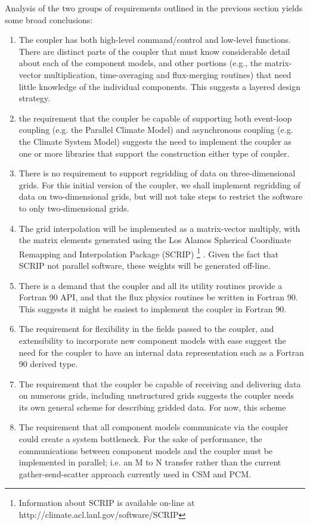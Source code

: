 \documentclass{article}
\begin{document}
Analysis of the two groups of requirements outlined in the
previous section yields some broad conclusions:
\begin{enumerate}
\item The coupler has both high-level command/control and
low-level functions.  There are distinct parts of the coupler
that must know considerable detail about each of the component
models, and other portions (e.g., the matrix-vector
multiplication, time-averaging and flux-merging routines) that
need little knowledge of the individual components.  This
suggests a layered design strategy.
\item the requirement that the coupler be capable of supporting
both event-loop coupling (e.g. the Parallel Climate Model) and
asynchronous coupling (e.g. the Climate System Model) suggests the
need to implement the coupler as one or more libraries that
support the construction either type of coupler.
\item There is no requirement to support regridding of data on
three-dimensional grids.  For this initial version of the
coupler, we shall implement regridding of data on two-dimensional
grids, but will not take steps to restrict the software to only
two-dimensional grids.
\item The grid interpolation will be implemented as a matrix-vector 
multiply, with the matrix elements generated using the Los Alamos
Spherical Coordinate Remapping and Interpolation Package (SCRIP) 
\footnote{Information about SCRIP is available on-line at 
http://climate.acl.lanl.gov/software/SCRIP} \cite{jones-1999}.  Given
the fact that SCRIP not parallel software, these weights will be 
generated off-line.
\item There is a demand that the coupler and all its utility routines
provide a Fortran 90 API, and that the flux physics routines be
written in Fortran 90.  This suggests it might be easiest to
implement the coupler in Fortran 90.
\item The requirement for flexibility in the fields passed to the
coupler, and extensibility to incorporate new component models
with ease suggest the need for the coupler to have an internal
data representation such as a Fortran 90 derived type.
\item The requirement that the coupler be capable of receiving and
delivering data on numerous grids, including unstructured grids
suggests the coupler needs its own general scheme for describing
gridded data.  For now, this scheme
\item The requirement that all component models communicate via
the coupler could create a system bottleneck.  For the sake of
performance, the communications between component models and the
coupler must be implemented in parallel; i.e. an M to N transfer
rather than the current gather-send-scatter approach currently
used in CSM and PCM.
\end{enumerate}
\end{document}
